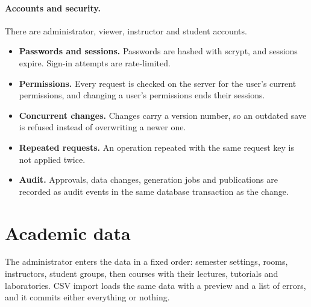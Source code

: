 \paragraph{Accounts and security.} There are administrator, viewer, instructor and student accounts.
\begin{itemize}
\item \textbf{Passwords and sessions.} Passwords are hashed with scrypt, and sessions expire. Sign-in attempts are rate-limited.
\item \textbf{Permissions.} Every request is checked on the server for the user's current permissions, and changing a user's permissions ends their sessions.
\item \textbf{Concurrent changes.} Changes carry a version number, so an outdated save is refused instead of overwriting a newer one.
\item \textbf{Repeated requests.} An operation repeated with the same request key is not applied twice.
\item \textbf{Audit.} Approvals, data changes, generation jobs and publications are recorded as audit events in the same database transaction as the change.
\end{itemize}

\section{Academic data}

The administrator enters the data in a fixed order: semester settings, rooms, instructors, student groups, then courses with their lectures, tutorials and laboratories. CSV import loads the same data with a preview and a list of errors, and it commits either everything or nothing.

